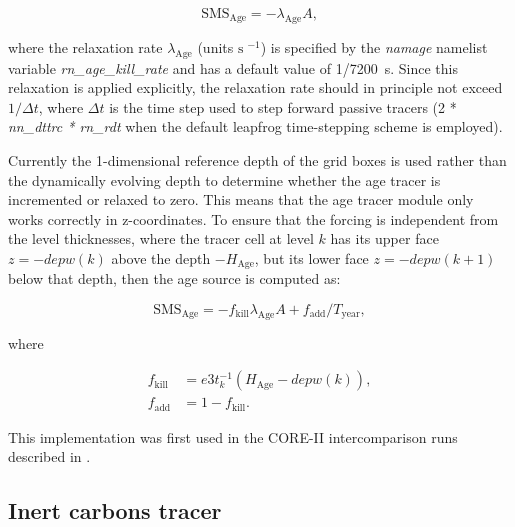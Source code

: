 \documentclass[../main/TOP_manual]{subfiles}
\begin{document}
\begin{equation}
  \label{eq:TOP-age-surface}
   \mathrm{SMS_{\mathrm{Age}}} = -\lambda_{\mathrm{Age}}A,
\end{equation}

where the relaxation rate $\lambda_{\mathrm{Age}}$  (units $\mathrm{s}\;^{-1}$) is specified by the \textit{namage} namelist variable \textit{rn\_age\_kill\_rate} and has a default value of 1/7200~s.
Since this relaxation is applied explicitly, the relaxation rate should in principle not exceed $1/\Delta t$, where $\Delta t$ is the time step used to step forward passive tracers (2 * \textit{nn\_dttrc * rn\_rdt} when the default  leapfrog time-stepping scheme is employed).

Currently the 1-dimensional reference depth of the grid boxes is used rather than the dynamically evolving depth to determine whether the age tracer is incremented or relaxed to zero.
This means that the age tracer module only works correctly in z-coordinates.
To ensure that the forcing is independent from the level thicknesses, where the tracer cell at level $k$ has its upper face $z=-depw(k)$ above the depth $-H_{\mathrm{Age}}$, but its lower face $z=-depw(k+1)$ below that depth, then the age source is computed as:

\begin{equation}
  \label{eq:TOP-age-mixed}
   \mathrm{SMS_{\mathrm{Age}}} = -f_{\mathrm{kill}}\lambda_{\mathrm{Age}}A +f_{\mathrm{add}}/T_{\mathrm{year}} ,
\end{equation}

where

\begin{align}
    f_{\mathrm{kill}} &= e3t_k^{-1}(H_{\mathrm{Age}} - depw(k)) , \\
    f_{\mathrm{add}} &= 1 - f_{\mathrm{kill}}.
\end{align}

This implementation was first used in the CORE-II intercomparison runs described in \citet{danabasoglu_2014}.

\subsection{Inert carbons tracer}

%
\end{document}
